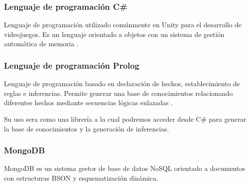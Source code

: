 \documentclass[12pt,twoside]{article}
\begin{document}
	\subsubsection{Lenguaje de programación C\#}
	Lenguaje de programación utilizado comúnmente en Unity para el desarrollo de videojuegos. Es un lenguaje orientado a objetos con un sistema de gestión automática de memoria  \cite{lan: c_sharp}.
	
	\subsubsection{Lenguaje de programación Prolog}
	Lenguaje de programación basado en declaración de hechos, establecimiento de reglas e inferencias. Permite generar una base de conocimientos relacionando diferentes hechos  mediante secuencias lógicas enlazadas \cite{lan: prolog}.
	
	Su uso sera como una librería a la cual podremos acceder desde C\# para generar la base de conocimientos y la generación de inferencias. 
	
	\subsubsection{MongoDB}
	MongoDB es un sistema gestor de base de datos NoSQL orientado a documentos con estructuras BSON y esquematización dinámica.
\end{document}
